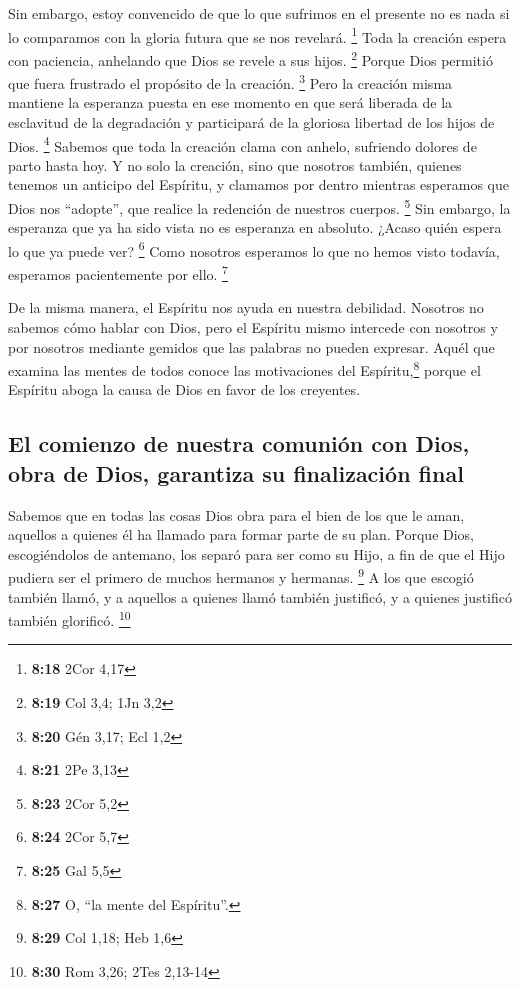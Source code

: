 Sin embargo, estoy convencido de que lo que sufrimos en
el presente no es nada si lo comparamos con la gloria futura que se nos
revelará. \footnote{\textbf{8:18} 2Cor 4,17}  Toda la
creación espera con paciencia, anhelando que Dios se revele a sus hijos.
\footnote{\textbf{8:19} Col 3,4; 1Jn 3,2}  Porque Dios
permitió que fuera frustrado el propósito de la creación. \footnote{\textbf{8:20}
  Gén 3,17; Ecl 1,2}  Pero la creación misma mantiene la
esperanza puesta en ese momento en que será liberada de la esclavitud de
la degradación y participará de la gloriosa libertad de los hijos de
Dios. \footnote{\textbf{8:21} 2Pe 3,13}  Sabemos que toda
la creación clama con anhelo, sufriendo dolores de parto hasta hoy.
 Y no solo la creación, sino que nosotros también,
quienes tenemos un anticipo del Espíritu, y clamamos por dentro mientras
esperamos que Dios nos ``adopte'', que realice la redención de nuestros
cuerpos. \footnote{\textbf{8:23} 2Cor 5,2}  Sin embargo,
la esperanza que ya ha sido vista no es esperanza en absoluto. ¿Acaso
quién espera lo que ya puede ver? \footnote{\textbf{8:24} 2Cor 5,7}
 Como nosotros esperamos lo que no hemos visto todavía,
esperamos pacientemente por ello. \footnote{\textbf{8:25} Gal 5,5}

 De la misma manera, el Espíritu nos ayuda en nuestra
debilidad. Nosotros no sabemos cómo hablar con Dios, pero el Espíritu
mismo intercede con nosotros y por nosotros mediante gemidos que las
palabras no pueden expresar.  Aquél que examina las
mentes de todos conoce las motivaciones del Espíritu,\footnote{\textbf{8:27}
  O, ``la mente del Espíritu''.} porque el Espíritu aboga la causa de
Dios en favor de los creyentes.

\hypertarget{el-comienzo-de-nuestra-comuniuxf3n-con-dios-obra-de-dios-garantiza-su-finalizaciuxf3n-final}{%
\subsection{El comienzo de nuestra comunión con Dios, obra de Dios,
garantiza su finalización
final}\label{el-comienzo-de-nuestra-comuniuxf3n-con-dios-obra-de-dios-garantiza-su-finalizaciuxf3n-final}}

 Sabemos que en todas las cosas Dios obra para el bien de
los que le aman, aquellos a quienes él ha llamado para formar parte de
su plan.  Porque Dios, escogiéndolos de antemano, los
separó para ser como su Hijo, a fin de que el Hijo pudiera ser el
primero de muchos hermanos y hermanas. \footnote{\textbf{8:29} Col 1,18;
  Heb 1,6}  A los que escogió también llamó, y a aquellos
a quienes llamó también justificó, y a quienes justificó también
glorificó. \footnote{\textbf{8:30} Rom 3,26; 2Tes 2,13-14}

